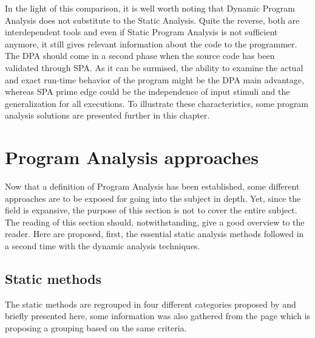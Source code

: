 \bigskip

In the light of this comparison, it is well worth noting that Dynamic Program Analysis does not substitute to the Static Analysis. Quite the reverse, both are interdependent tools and even if Static Program Analysis is not sufficient anymore, it still gives relevant information about the code to the programmer. The DPA should come in a second phase when the source code has been validated through SPA. As it can be surmised, the ability to examine the actual and exact run-time behavior of the program might be the DPA main advantage, whereas SPA prime edge could be the independence of input stimuli and the generalization for all executions. To illustrate these characteristics, some program analysis solutions are presented further in this chapter.

\pagebreak

\section{Program Analysis approaches}
Now that a definition of Program Analysis has been established, some different approaches are to be exposed for going into the subject in depth. Yet, since the field is expansive, the purpose of this section is not to cover the entire subject. The reading of this section should, notwithstanding, give a good overview to the reader. Here are proposed, first, the essential static analysis methods followed in a second time with the dynamic analysis techniques.

\subsection{Static methods}

The static methods are regrouped in four different categories proposed by \cite{Nielson2004} and briefly presented here, some information was also gathered from the \cite{Wikipedi2016} page which is proposing a grouping based on the same criteria.

